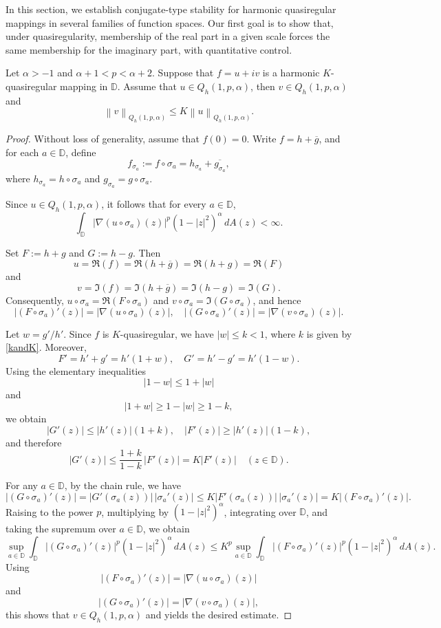 \documentclass[12pt, reqno]{amsart}
\begin{document}
In this section, we establish conjugate-type stability for harmonic quasiregular mappings in several families of function spaces.
Our first goal is to show that, under quasiregularity, membership of the real part in a given scale forces the same membership for the imaginary part, with quantitative control.

\begin{theorem}\label{v<u}
Let $\alpha>-1$ and $\alpha+1<p<\alpha+2$.
Suppose that $f=u+iv$ is a harmonic $K$-quasiregular mapping in $\mathbb D$.
Assume that $u\in Q_h(1,p,\alpha)$,
then $v\in Q_h(1,p,\alpha)$ and
$$\left \|v  \right \| _{Q_h(1,p,\alpha)}\le K\left \|u  \right \| _{Q_h(1,p,\alpha)}.$$
\end{theorem}

\begin{proof}
Without loss of generality, assume that $f(0)=0$. Write $f=h+\overline{g}$, and for each $a\in\mathbb D$, define
$$f_{\sigma_a}:=f\circ\sigma_a=h_{\sigma_a}+\overline{g_{\sigma_a}},$$ where $h_{\sigma_a}=h\circ\sigma_a$ and $g_{\sigma_a}=g\circ\sigma_a$.

Since $u\in Q_h(1,p,\alpha)$, it follows that for every $a\in\mathbb D$,
$$
\int_{\mathbb{D}}\bigl|\nabla(u\circ\sigma_a)(z)\bigr|^{p}(1-|z|^{2})^{\alpha}\,dA(z)<\infty.
$$

Set $F:=h+g$ and $G:=h-g$. Then
$$u=\Re(f)=\Re(h+\overline{g})=\Re(h+g)=\Re(F)$$
and
$$v=\Im(f)=\Im(h+\overline{g})=\Im(h-g)=\Im(G).$$
Consequently,
$u\circ\sigma_a=\Re(F\circ\sigma_a)$ and $v\circ\sigma_a=\Im(G\circ\sigma_a)$, and hence
$$
\bigl|(F\circ\sigma_a)'(z)\bigr|=\bigl|\nabla(u\circ\sigma_a)(z)\bigr|,
\quad
\bigl|(G\circ\sigma_a)'(z)\bigr|=\bigl|\nabla(v\circ\sigma_a)(z)\bigr|.
$$

Let $w={g'}/{h'}$. Since $f$ is $K$-quasiregular, we have $|w|\le k<1$, where $k$ is given by \eqref{kandK}.
Moreover,
$$
F'=h'+g'=h'(1+w),
\quad
G'=h'-g'=h'(1-w).
$$
Using the elementary inequalities $$|1-w|\le 1+|w|$$ and $$|1+w|\ge 1-|w|\ge 1-k,$$ we obtain
$$
|G'(z)|\le |h'(z)|(1+k),
\quad
|F'(z)|\ge |h'(z)|(1-k),
$$
and therefore
$$
|G'(z)|\le \frac{1+k}{1-k}\,|F'(z)|=K|F'(z)|
\quad (z\in\mathbb D).
$$

For any $a\in\mathbb D$, by the chain rule, we have
$$
\bigl|(G\circ\sigma_a)'(z)\bigr|
=\bigl|G'(\sigma_a(z))\bigr|\,\bigl|\sigma_a'(z)\bigr|
\le K\bigl|F'(\sigma_a(z))\bigr|\,\bigl|\sigma_a'(z)\bigr|
=K\bigl|(F\circ\sigma_a)'(z)\bigr|.
$$
Raising to the power $p$, multiplying by $(1-|z|^{2})^{\alpha}$, integrating over $\mathbb D$, and taking the supremum over $a\in\mathbb D$, we obtain
$$
\sup_{a\in\mathbb{D}}\int_{\mathbb{D}}\bigl|(G\circ\sigma_a)'(z)\bigr|^{p}(1-|z|^{2})^{\alpha}\,dA(z)
\le K^{p}\sup_{a\in\mathbb{D}}\int_{\mathbb{D}}\bigl|(F\circ\sigma_a)'(z)\bigr|^{p}(1-|z|^{2})^{\alpha}\,dA(z).
$$
Using $$\bigl|(F\circ\sigma_a)'(z)\bigr|=\bigl|\nabla(u\circ\sigma_a)(z)\bigr|$$ and $$\bigl|(G\circ\sigma_a)'(z)\bigr|=\bigl|\nabla(v\circ\sigma_a)(z)\bigr|,$$ this shows that $v\in Q_h(1,p,\alpha)$ and yields the desired estimate.
\end{proof}
\end{document}
